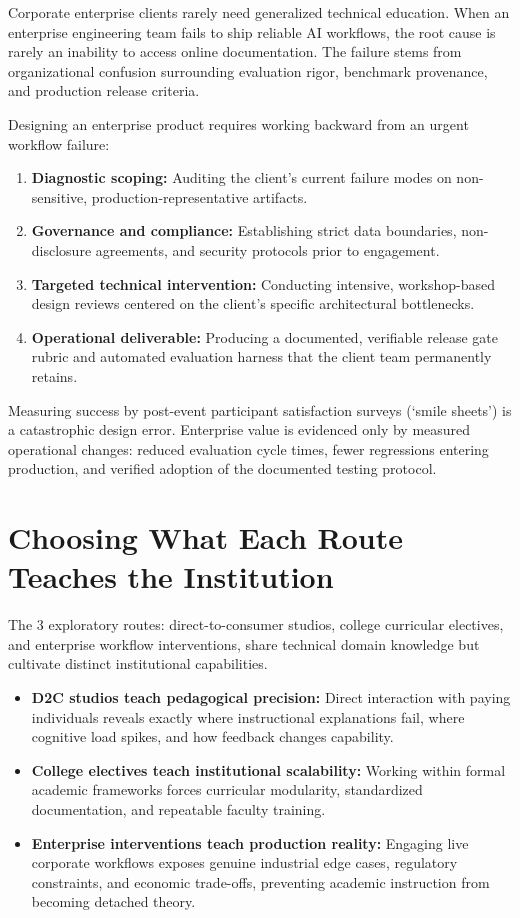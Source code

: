Corporate enterprise clients rarely need generalized technical education. When an enterprise engineering team fails to ship reliable AI workflows, the root cause is rarely an inability to access online documentation. The failure stems from organizational confusion surrounding evaluation rigor, benchmark provenance, and production release criteria.

Designing an enterprise product requires working backward from an urgent workflow failure:
\begin{enumerate}[leftmargin=*]
\item \textbf{Diagnostic scoping:} Auditing the client's current failure modes on non-sensitive, production-representative artifacts.
\item \textbf{Governance and compliance:} Establishing strict data boundaries, non-disclosure agreements, and security protocols prior to engagement.
\item \textbf{Targeted technical intervention:} Conducting intensive, workshop-based design reviews centered on the client's specific architectural bottlenecks.
\item \textbf{Operational deliverable:} Producing a documented, verifiable release gate rubric and automated evaluation harness that the client team permanently retains.
\end{enumerate}

Measuring success by post-event participant satisfaction surveys (`smile sheets') is a catastrophic design error. Enterprise value is evidenced only by measured operational changes: reduced evaluation cycle times, fewer regressions entering production, and verified adoption of the documented testing protocol.

\section{Choosing What Each Route Teaches the Institution}

The 3 exploratory routes: direct-to-consumer studios, college curricular electives, and enterprise workflow interventions, share technical domain knowledge but cultivate distinct institutional capabilities.

\begin{itemize}[leftmargin=*]
\item \textbf{D2C studios teach pedagogical precision:} Direct interaction with paying individuals reveals exactly where instructional explanations fail, where cognitive load spikes, and how feedback changes capability.
\item \textbf{College electives teach institutional scalability:} Working within formal academic frameworks forces curricular modularity, standardized documentation, and repeatable faculty training.
\item \textbf{Enterprise interventions teach production reality:} Engaging live corporate workflows exposes genuine industrial edge cases, regulatory constraints, and economic trade-offs, preventing academic instruction from becoming detached theory.
\end{itemize}

